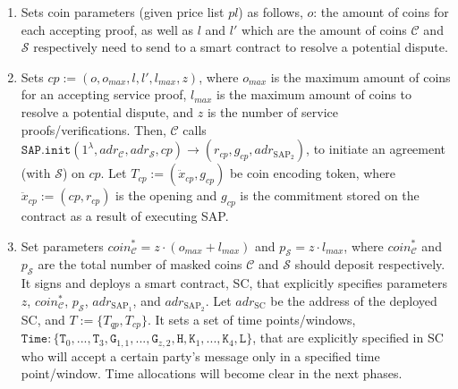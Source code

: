 \begin{enumerate}
\begin{enumerate}
\item   Sets coin parameters (given  price list $pl$) as  follows,  $o$: the amount of coins for each accepting proof,  as well as $l$ and $l'$ which are the amount of coins $\mathcal C$ and $\mathcal S$ respectively need to send to a smart contract to resolve a potential dispute. 





\item  Sets  $cp:=(o,o_{\scriptscriptstyle max}, l, l', l_{\scriptscriptstyle max},z)$, where $o_{\scriptscriptstyle max}$ is the maximum amount of coins  for an accepting service proof,  $l_{\scriptscriptstyle max}$  is the maximum amount of coins to resolve a potential dispute, and $z$ is the number of  service proofs/verifications. Then, $\mathcal C$ calls $\mathtt{SAP.init}(1^{\scriptscriptstyle\lambda}, adr_{\scriptscriptstyle\mathcal{C}}, adr_{\scriptscriptstyle\mathcal{S}},cp )\rightarrow(r_{\scriptscriptstyle cp},g_{\scriptscriptstyle cp},adr_{\scriptscriptstyle\text{SAP}_{\scriptscriptstyle 2}})$, to initiate an agreement (with $\mathcal{S}$) on $cp$. Let $T_{\scriptscriptstyle cp}:=(\ddot{x}_{\scriptscriptstyle cp},g_{\scriptscriptstyle cp})$ be coin encoding token,  where  $\ddot{x}_{\scriptscriptstyle cp}:=(cp,r_{\scriptscriptstyle cp})$ is the opening and $g_{\scriptscriptstyle cp}$ is the commitment stored on the contract as a result of executing   SAP.  





\item Set parameters  $coin^{\scriptscriptstyle *}_{\scriptscriptstyle\mathcal C}=z\cdot (o_{\scriptscriptstyle max}+l_{\scriptscriptstyle max})$ and $p_{\scriptscriptstyle\mathcal{S}}=z\cdot l_{\scriptscriptstyle max}$, where $coin^{\scriptscriptstyle *}_{\scriptscriptstyle\mathcal C}$ and $p_{\scriptscriptstyle\mathcal{S}}$ are   the total number of masked coins $\mathcal C$ and $\mathcal S$ should deposit respectively. It signs and deploys a smart contract, SC, that explicitly specifies  parameters $z$,  $coin^{\scriptscriptstyle *}_{\scriptscriptstyle\mathcal C}$, $p_{\scriptscriptstyle\mathcal{S}}$,  $adr_{\scriptscriptstyle\text{SAP}_{\scriptscriptstyle 1}}$, and $adr_{\scriptscriptstyle\text{SAP}_{\scriptscriptstyle 2}}$. Let $adr_{\scriptscriptstyle \text{SC}}$ be the address of the deployed SC, and $T:=\{T_{\scriptscriptstyle qp},T_{\scriptscriptstyle cp}\}$. It sets a set of time points/windows, $\texttt{Time}:\{ \texttt{T}_{\scriptscriptstyle 0},..., \texttt{T}_{\scriptscriptstyle 3},\texttt{G}_{\scriptscriptstyle 1,1},...,\texttt{G}_{\scriptscriptstyle z,2},\texttt{H}, \texttt{K}_{\scriptscriptstyle 1},...,\texttt{K}_{\scriptscriptstyle 4}, \texttt{L}\}$, that are explicitly specified in SC who will accept a certain party's message only in a specified  time point/window. Time allocations will become clear in the next phases. 



\end{enumerate}
\end{enumerate}
